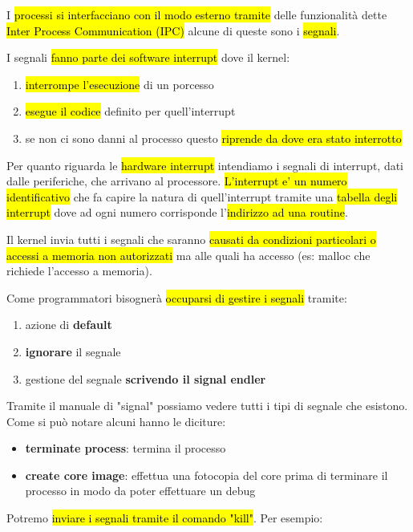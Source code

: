 I \hl{processi si interfacciano con il modo esterno tramite} delle funzionalità dette \hl{Inter Process Communication (IPC)} alcune di queste sono i \hl{segnali}.

I segnali \hl{fanno parte dei software interrupt} dove il kernel:

\begin{enumerate}
	\item \hl{interrompe l'esecuzione} di un porcesso
	\item \hl{esegue il codice} definito per quell'interrupt
	\item se non ci sono danni al processo questo \hl{riprende da dove era stato interrotto}
\end{enumerate}

Per quanto riguarda le \hl{hardware interrupt} intendiamo i segnali di interrupt, dati dalle periferiche, che arrivano al processore. \hl{L'interrupt e' un numero identificativo} che fa capire la natura di quell'interrupt tramite una \hl{tabella degli interrupt} dove ad ogni numero corrisponde l'\hl{indirizzo ad una routine}.

Il kernel invia tutti i segnali che saranno \hl{causati da condizioni particolari o accessi a memoria non autorizzati} ma alle quali ha accesso (es: malloc che richiede l'accesso a memoria).

Come programmatori bisognerà \hl{occuparsi di gestire i segnali} tramite:

\begin{enumerate}
	\item azione di \textbf{default}
	\item \textbf{ignorare} il segnale
	\item gestione del segnale \textbf{scrivendo il signal endler}
\end{enumerate}

Tramite il manuale di "signal" possiamo vedere tutti i tipi di segnale che esistono. Come si può notare alcuni hanno le diciture:

\begin{itemize}
	\item \textbf{terminate process}: termina il processo
	\item \textbf{create core image}: effettua una fotocopia del core prima di terminare il processo in modo da poter effettuare un debug
\end{itemize}

Potremo \hl{inviare i segnali tramite il comando "kill"}. Per esempio:

